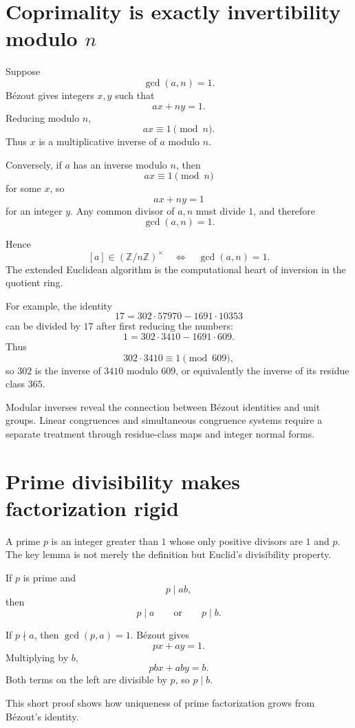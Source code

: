 \section{Coprimality is exactly invertibility modulo \texorpdfstring{$n$}{n}}

Suppose
\[
  \gcd(a,n)=1.
\]
Bézout gives integers \(x,y\) such that
\[
  ax+ny=1.
\]
Reducing modulo \(n\),
\[
  ax\equiv1\pmod n.
\]
Thus \(x\) is a multiplicative inverse of \(a\) modulo \(n\).

Conversely, if \(a\) has an inverse modulo \(n\), then
\[
  ax\equiv1\pmod n
\]
for some \(x\), so
\[
  ax+ny=1
\]
for an integer \(y\).  Any common divisor of \(a,n\) must divide \(1\), and therefore
\[
  \gcd(a,n)=1.
\]

Hence
\[
  [a]\in(\mathbb Z/n\mathbb Z)^\times
  \quad\Longleftrightarrow\quad
  \gcd(a,n)=1.
\]
The extended Euclidean algorithm is the computational heart of inversion in the quotient ring.

For example, the identity
\[
  17=302\cdot57970-1691\cdot10353
\]
can be divided by \(17\) after first reducing the numbers:
\[
  1=302\cdot3410-1691\cdot609.
\]
Thus
\[
  302\cdot3410\equiv1\pmod{609},
\]
so \(302\) is the inverse of \(3410\) modulo \(609\), or equivalently the inverse of its residue class \(365\).

Modular inverses reveal the connection between Bézout identities and unit groups.  Linear congruences and simultaneous congruence systems require a separate treatment through residue-class maps and integer normal forms.

\section{Prime divisibility makes factorization rigid}

A prime \(p\) is an integer greater than \(1\) whose only positive divisors are \(1\) and \(p\).  The key lemma is not merely the definition but Euclid's divisibility property.

\begin{proposition}
If \(p\) is prime and
\[
  p\mid ab,
\]
then
\[
  p\mid a
  \qquad\text{or}\qquad
  p\mid b.
\]
\end{proposition}

If \(p\nmid a\), then \(\gcd(p,a)=1\).  Bézout gives
\[
  px+ay=1.
\]
Multiplying by \(b\),
\[
  pbx+aby=b.
\]
Both terms on the left are divisible by \(p\), so \(p\mid b\).

This short proof shows how uniqueness of prime factorization grows from Bézout's identity.

